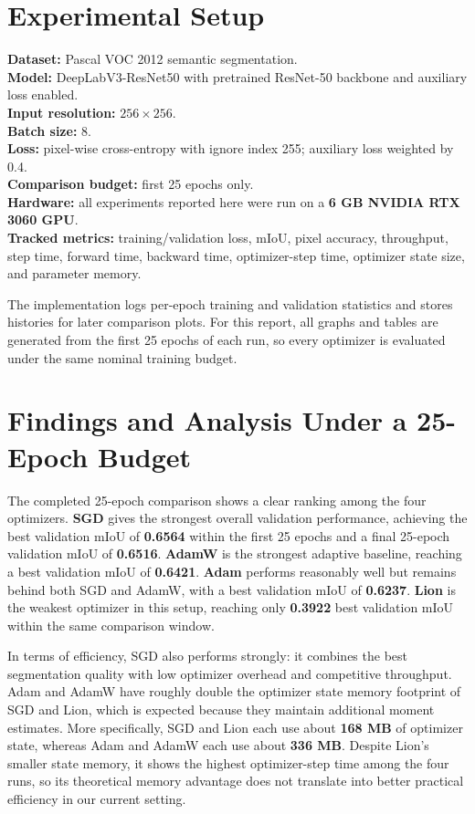 \documentclass[10pt]{article}
\begin{document}
\section{Experimental Setup}
\textbf{Dataset:} Pascal VOC 2012 semantic segmentation. \\
\textbf{Model:} DeepLabV3-ResNet50 with pretrained ResNet-50 backbone and auxiliary loss enabled. \\
\textbf{Input resolution:} $256 \times 256$. \\
\textbf{Batch size:} 8. \\
\textbf{Loss:} pixel-wise cross-entropy with ignore index 255; auxiliary loss weighted by 0.4. \\
\textbf{Comparison budget:} first 25 epochs only. \\
\textbf{Hardware:} all experiments reported here were run on a \textbf{6 GB NVIDIA RTX 3060 GPU}. \\
\textbf{Tracked metrics:} training/validation loss, mIoU, pixel accuracy, throughput, step time, forward time, backward time, optimizer-step time, optimizer state size, and parameter memory.

The implementation logs per-epoch training and validation statistics and stores histories for later comparison plots. For this report, all graphs and tables are generated from the first 25 epochs of each run, so every optimizer is evaluated under the same nominal training budget.

\section{Findings and Analysis Under a 25-Epoch Budget}
The completed 25-epoch comparison shows a clear ranking among the four optimizers. \textbf{SGD} gives the strongest overall validation performance, achieving the best validation mIoU of \textbf{0.6564} within the first 25 epochs and a final 25-epoch validation mIoU of \textbf{0.6516}. \textbf{AdamW} is the strongest adaptive baseline, reaching a best validation mIoU of \textbf{0.6421}. \textbf{Adam} performs reasonably well but remains behind both SGD and AdamW, with a best validation mIoU of \textbf{0.6237}. \textbf{Lion} is the weakest optimizer in this setup, reaching only \textbf{0.3922} best validation mIoU within the same comparison window.

In terms of efficiency, SGD also performs strongly: it combines the best segmentation quality with low optimizer overhead and competitive throughput. Adam and AdamW have roughly double the optimizer state memory footprint of SGD and Lion, which is expected because they maintain additional moment estimates. More specifically, SGD and Lion each use about \textbf{168 MB} of optimizer state, whereas Adam and AdamW each use about \textbf{336 MB}. Despite Lion's smaller state memory, it shows the highest optimizer-step time among the four runs, so its theoretical memory advantage does not translate into better practical efficiency in our current setting.
\end{document}
